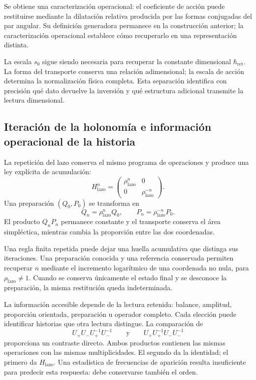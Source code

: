 Se obtiene una caracterización operacional: el coeficiente de acción
puede restituirse mediante la dilatación relativa producida por las
formas conjugadas del par angular. Su definición generadora permanece
en la construcción anterior; la caracterización operacional establece
cómo recuperarlo en una representación distinta.

La escala $s_0$ sigue siendo necesaria para recuperar la constante
dimensional $\hbar_{\mathrm{ret}}$. La forma del transporte conserva
una relación adimensional; la escala de acción determina la
normalización física completa. Esta separación identifica con precisión
qué dato devuelve la inversión y qué estructura adicional transmite la
lectura dimensional.

\subsection{Iteración de la holonomía e información operacional de la historia}
\label{subsec:narrativa-informacion-operacional}

La repetición del lazo conserva el mismo programa de operaciones y
produce una ley explícita de acumulación:
\begin{equation}
 H_{\mathrm{lazo}}^n=
 \begin{pmatrix}\rho_{\mathrm{lazo}}^n&0\\
                 0&\rho_{\mathrm{lazo}}^{-n}\end{pmatrix}.
 \label{eq:narrativa-iteracion-lazo}
\end{equation}
Una preparación $(Q_0,P_0)$ se transforma en
\begin{equation}
 Q_n=\rho_{\mathrm{lazo}}^nQ_0,
 \qquad
 P_n=\rho_{\mathrm{lazo}}^{-n}P_0.
 \label{eq:narrativa-iteracion-estado}
\end{equation}
El producto $Q_nP_n$ permanece constante y el transporte conserva
el área simpléctica, mientras cambia la proporción entre las dos
coordenadas.

Una regla finita repetida puede dejar una huella acumulativa que
distinga sus iteraciones. Una preparación conocida y una referencia
conservada permiten recuperar $n$ mediante el incremento logarítmico
de una coordenada no nula, para $\rho_{\mathrm{lazo}}\ne1$.
Cuando se conserva
únicamente el estado final y se desconoce la preparación, la misma
restitución queda indeterminada.

La información accesible depende de la lectura retenida: balance,
amplitud, proporción orientada, preparación u operador completo. Cada
elección puede identificar historias que otra lectura distingue.
La comparación de
\begin{equation}
 U_+U_-U_+^{-1}U_-^{-1}
 \qquad\text{y}\qquad
 U_+U_+^{-1}U_-U_-^{-1}
 \label{eq:narrativa-orden-multiplicidades}
\end{equation}
proporciona un contraste directo. Ambos productos contienen las mismas
operaciones con las mismas multiplicidades. El segundo da la identidad;
el primero da $H_{\mathrm{lazo}}$. Una estadística de frecuencias de
aparición resulta insuficiente para predecir esta respuesta: debe
conservarse también el orden.

